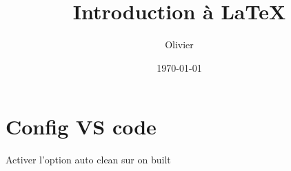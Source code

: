 \documentclass[a5paper,12pt,oneside]{article}
\title{Introduction à \LaTeX}
\author{Olivier \bsc{Morel}}
\date{\today}
\begin{document}
\maketitle

	\thispagestyle{empty}
	\setcounter{page}{1}
	\newpage

\tableofcontents
\clearpage
	
\section{Config VS code}
Activer l'option auto clean sur on built


\clearpage

\clearpage

\clearpage

\clearpage

\clearpage

\clearpage
\end{document}
